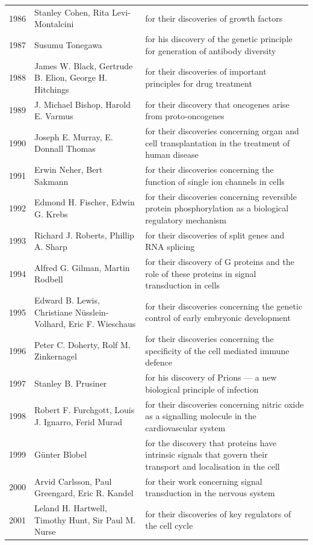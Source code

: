 \documentclass[12pt,a4paper]{book}
\begin{document}
{\begin{longtable}{cp{3.2cm}p{5.5cm}}
1986 & Stanley Cohen, Rita Levi-Montalcini & for their discoveries of growth factors \\
1987 & Susumu Tonegawa & for his discovery of the genetic principle for generation of antibody diversity \\
1988 & James W. Black, Gertrude B. Elion, George H. Hitchings & for their discoveries of important principles for drug treatment \\
1989 & J. Michael Bishop, Harold E. Varmus & for their discovery that oncogenes arise from proto-oncogenes \\
1990 & Joseph E. Murray, E. Donnall Thomas & for their discoveries concerning organ and cell transplantation in the treatment of human disease \\
1991 & Erwin Neher, Bert Sakmann & for their discoveries concerning the function of single ion channels in cells \\
1992 & Edmond H. Fischer, Edwin G. Krebs & for their discoveries concerning reversible protein phosphorylation as a biological regulatory mechanism \\
1993 & Richard J. Roberts, Phillip A. Sharp & for their discoveries of split genes and RNA splicing \\
1994 & Alfred G. Gilman, Martin Rodbell & for their discovery of G proteins and the role of these proteins in signal transduction in cells \\
1995 & Edward B. Lewis, Christiane N\"usslein-Volhard, Eric F. Wieschaus & for their discoveries concerning the genetic control of early embryonic development \\
1996 & Peter C. Doherty, Rolf M. Zinkernagel & for their discoveries concerning the specificity of the cell mediated immune defence \\
1997 & Stanley B. Prusiner & for his discovery of Prions --- a new biological principle of infection \\
1998 & Robert F. Furchgott, Louis J. Ignarro, Ferid Murad & for their discoveries concerning nitric oxide as a signalling molecule in the cardiovascular system \\
1999 & G\"unter Blobel & for the discovery that proteins have intrinsic signals that govern their transport and localisation in the cell \\
2000 & Arvid Carlsson, Paul Greengard, Eric R. Kandel & for their work concerning signal transduction in the nervous system \\
2001 & Leland H. Hartwell, Timothy Hunt, Sir Paul M. Nurse & for their discoveries of key regulators of the cell cycle \\

\end{longtable}}
\end{document}
